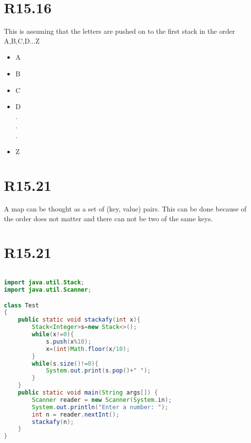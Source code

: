 \documentclass{article}
\begin{document}
\section{R15.16}
This is assuming that the letters are pushed on to the first stack in the order A,B,C,D...Z
\begin{itemize}
  \item A
  \item B
  \item C
  \item D\\
  .\\
  .\\
  .
  \item Z
\end{itemize}
\section{R15.21}
A map can be thought as a set of (key, value) pairs. This can be done because of the order does not matter and there can not be two of the same keys.
\section{R15.21}
\begin{lstlisting}[language=Java]

import java.util.Stack;
import java.util.Scanner;

class Test
{
    public static void stackafy(int x){
        Stack<Integer>s=new Stack<>();
        while(x!=0){
            s.push(x%10);
            x=(int)Math.floor(x/10);
        }
        while(s.size()!=0){
            System.out.print(s.pop()+" ");
        }
    }
    public static void main(String args[]) {
        Scanner reader = new Scanner(System.in);
        System.out.println("Enter a number: ");
        int n = reader.nextInt();
        stackafy(n);
    }
}


\end{lstlisting}
\end{document}

